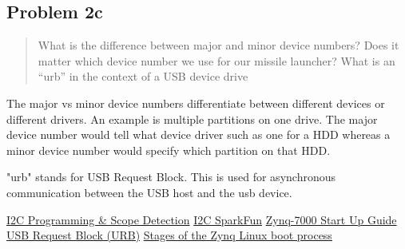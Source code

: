 \documentclass[10pt,a4paper]{article}
\let\oldsubsection\subsection
\renewcommand{\subsection}{%
    \setcounter{equation}{0}%
    \oldsubsection%
}
\begin{document}
\subsection{Problem 2c}\begin{quote}

What is the difference between major and minor device numbers? Does it matter which device number
we use for our missile launcher?
What is an “urb” in the context of a USB device drive
\end{quote}

The major vs minor device numbers differentiate between different devices or different drivers. An example is multiple partitions on one drive. The major device number would tell what device driver such as one for a HDD whereas a minor device number would specify which partition on that HDD.


"urb" stands for USB Request Block. This is used for asynchronous communication between the USB host and the usb device.\cite{linux}


\begin{thebibliography}{9}

\href{https://jeremyclark.ca/wp/telecom/i2c-programming-scope-detection/}{I2C Programming \& Scope Detection}
\href{https://learn.sparkfun.com/tutorials/i2c/all
}{I2C SparkFun}
\href{https://xilinx-wiki.atlassian.net/wiki/spaces/A/pages/189530183/Zynq-7000}{Zynq-7000 Start Up Guide}
\href{https://docs.kernel.org/driver-api/usb/URB.html
}{USB Request Block (URB)}
\href{https://tutorials.logictronix.com/our-resources/petalinux-development/stages-of-the-zynq-linux-boot-process/}{Stages of the Zynq Linux boot process}

\end{thebibliography}
\end{document}
